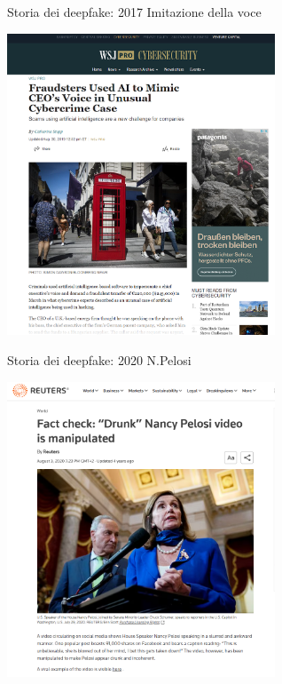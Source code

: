 \documentclass[11pt]{beamer}
\begin{document}
\begin{frame}{Storia dei deepfake: 2017 Imitazione della voce \cite{wsj_audio}}

\begin{center}
\includegraphics[width=0.6\textwidth]{Pic/deepfake_audio.png}
\end{center}

\end{frame}




\begin{frame}{Storia dei deepfake: 2020 N.Pelosi \cite{wsj_audio}}

\begin{center}
\includegraphics[width=0.6\textwidth]{Pic/fake_video_pelosi.png}
\end{center}

\end{frame}
\end{document}
